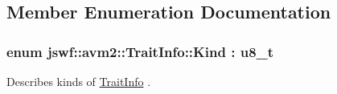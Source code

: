 \subsection{Member Enumeration Documentation}
\hypertarget{structjswf_1_1avm2_1_1_trait_info_ac0348c80fb68f4cdf615b064656d186c}{
\subsubsection[{Kind}]{\setlength{\rightskip}{0pt plus 5cm}enum {\bf jswf\+::avm2\+::\+Trait\+Info\+::\+Kind} \+: {\bf u8\+\_\+t}}}\label{structjswf_1_1avm2_1_1_trait_info_ac0348c80fb68f4cdf615b064656d186c}


Describes kinds of \hyperlink{structjswf_1_1avm2_1_1_trait_info}{Trait\+Info} . 

